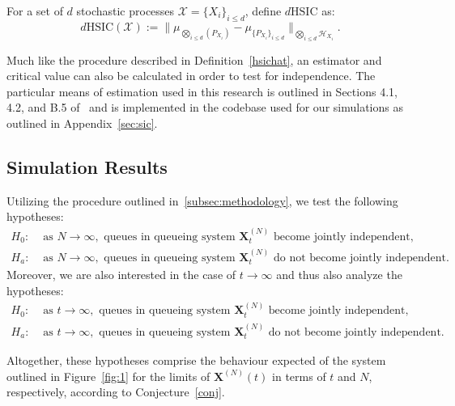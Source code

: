 \begin{definition}[$d$HSIC]

    \label{dhsic}
    For a set of $d$ stochastic processes $\mathcal{X} = \{X_{i}\}_{i \leq d}$, define $d\text{HSIC}$ as:
    \[d\text{HSIC}(\mathcal{X}) := \|\mu_{\bigotimes_{i \leq d}(P_{X_{i}})} - \mu_{\{P_{X_{i}}\}_{i \leq d}}\|_{\bigotimes_{i \leq d}\mathcal{H}_{X_{i}}}.\]
\end{definition}

Much like the procedure described in Definition~\ref{hsichat}, an estimator and critical value can also be calculated in order to test for independence.
The particular means of estimation used in this research is outlined in Sections 4.1, 4.2, and B.5 of~\cite{jointindep} and is
implemented in the codebase used for our simulations as outlined in Appendix~\ref{sec:sic}.

\subsection{Simulation Results}\label{subsec:simulation-results}
Utilizing the procedure outlined in~\ref{subsec:methodology}, we test the following hypotheses:
\begin{align*}
    \label{set 2}
    H_{0}:& \text{ as } N\rightarrow \infty, \text{ queues in queueing system } \mathbf{X}_{t}^{(N)} \text{ become jointly independent,}  \\
    H_{a}:& \text{ as } N\rightarrow \infty, \text{ queues in queueing system } \mathbf{X}_{t}^{(N)} \text{ do not become jointly independent.}
\end{align*}
Moreover, we are also interested in the case of $t \rightarrow \infty$ and thus also analyze the hypotheses:
\begin{align*}
    \label{set 1}
    H_{0}:& \text{ as } t\rightarrow \infty, \text{ queues in queueing system } \mathbf{X}_{t}^{(N)} \text{ become jointly independent,}  \\
    H_{a}:& \text{ as } t\rightarrow \infty, \text{ queues in queueing system } \mathbf{X}_{t}^{(N)} \text{ do not become jointly independent.}
\end{align*}

Altogether, these hypotheses comprise the behaviour expected of the system outlined in Figure~\ref{fig:1} for the limits of $\mathbf{X}^{(N)}(t)$
in terms of $t$ and $N$, respectively, according to Conjecture~\ref{conj}.

